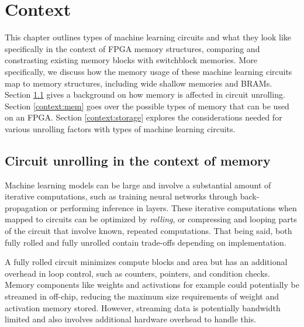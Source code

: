 

\chapter{Context}
\label{ch:Context}

This chapter outlines types of machine learning circuits and what they look like specifically in the context of FPGA memory structures, comparing and constrasting existing memory blocks with switchblock memories. More specifically, we discuss how the memory usage of these machine learning circuits map to memory structures, including wide shallow memories and BRAMs.
Section \ref{context:unroll} gives a background on how memory is affected in circuit unrolling. Section \ref{context:mem} goes over the possible types of memory that can be used on an FPGA. Section \ref{context:storage} explores the considerations needed for various unrolling factors with types of machine learning circuits.




\section{Circuit unrolling in the context of memory}
\label{context:unroll}

Machine learning models can be large and involve a substantial amount of iterative computations, such as training neural networks through back-propagation or performing inference in layers. These iterative computations when mapped to circuits can be optimized by \textit{rolling}, or compressing and looping parts of the circuit that involve known, repeated computations. That being said, both fully rolled and fully unrolled contain trade-offs depending on implementation.

A fully rolled circuit minimizes compute blocks and area but has an additional overhead in loop control, such as counters, pointers, and condition checks. Memory components like weights and activations for example could potentially be streamed in off-chip, reducing the maximum size requirements of weight and activation memory stored. However, streaming data is potentially bandwidth limited and also involves additional hardware overhead to handle this. 

